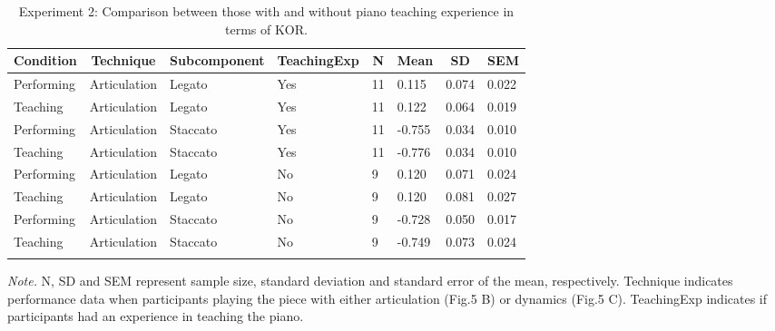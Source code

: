\documentclass[
  man,floatsintext]{apa6}
\begin{document}
\begin{table}[tbp]

\begin{center}
\begin{threeparttable}

\caption{\label{tab:art-teaching-desc-2}Experiment 2: Comparison between those with and without piano teaching experience in terms of KOR.}

\begin{tabular}{llllllll}
\toprule
Condition & \multicolumn{1}{c}{Technique} & \multicolumn{1}{c}{Subcomponent} & \multicolumn{1}{c}{TeachingExp} & \multicolumn{1}{c}{N} & \multicolumn{1}{c}{Mean} & \multicolumn{1}{c}{SD} & \multicolumn{1}{c}{SEM}\\
\midrule
Performing & Articulation & Legato & Yes & 11 & 0.115 & 0.074 & 0.022\\
Teaching & Articulation & Legato & Yes & 11 & 0.122 & 0.064 & 0.019\\
Performing & Articulation & Staccato & Yes & 11 & -0.755 & 0.034 & 0.010\\
Teaching & Articulation & Staccato & Yes & 11 & -0.776 & 0.034 & 0.010\\
Performing & Articulation & Legato & No & 9 & 0.120 & 0.071 & 0.024\\
Teaching & Articulation & Legato & No & 9 & 0.120 & 0.081 & 0.027\\
Performing & Articulation & Staccato & No & 9 & -0.728 & 0.050 & 0.017\\
Teaching & Articulation & Staccato & No & 9 & -0.749 & 0.073 & 0.024\\
\bottomrule
\addlinespace
\end{tabular}

\begin{tablenotes}[para]
\normalsize{\textit{Note.} N, SD and SEM represent sample size, standard deviation and standard error of the mean, respectively. Technique indicates performance data when participants playing the piece with either articulation (Fig.5 B) or dynamics (Fig.5 C). TeachingExp indicates if participants had an experience in teaching the piano.}
\end{tablenotes}

\end{threeparttable}
\end{center}

\end{table}
\end{document}
